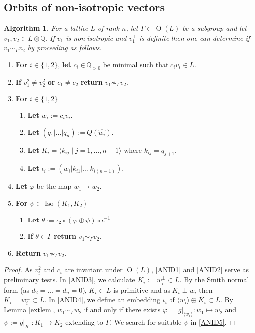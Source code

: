 \documentclass[12pt, a4paper]{article}
\newtheorem{algo}{Algorithm}[section]
\newcommand{\QQ}{\mathbb{Q}}
\newcommand{\la}{\langle}
\newcommand{\ra}{\rangle}
\newcommand{\opn}{\operatorname}
\newcommand{\op}{\oplus}
\begin{document}
\subsection{Orbits of non-isotropic vectors}
\begin{algo}\label{non_iso_def_alg}
  For a lattice $L$ of rank $n$,  let $\Gamma \subset \opn{O}(L)$ be a subgroup and let $v_1, v_2 \in L \otimes \QQ$.
  If $v_1$ is non-isotropic and $v_1^{\perp}$ is definite then one can determine if $v_1  \sim_{\Gamma} v_2$ by proceeding as follows. 
\end{algo}
\begin{enumerate}
\item \textbf{For} $i \in \{1,2 \}$, \textbf{let} $c_i \in \QQ_{>0}$ be minimal such that $c_i v_i \in L$. \label{ANID1}
\item    \textbf{If} $v_1^2 \neq v_2^2$ \textbf{or} $c_1 \neq c_2$ \textbf{return} $v_1 \not \sim_{\Gamma} v_2$.    \label{ANID2}
\item \textbf{For} $i \in \{1,2 \}$         \label{ANID3}
  \begin{enumerate}
  \item \textbf{Let} $w_i := c_i v_i$.
  \item \textbf{Let} $(q_1 \vert \ldots \vert q_n):=Q(\hat{w_i})$.
  \item \textbf{Let} $K_i=\la k_{ij} \mid j=1, \ldots, n-1 \ra$ where $k_{ij}=q_{j+1}$.
  \item \textbf{Let} $\iota_i:=(w_i \vert k_{i1} \vert \ldots \vert k_{i(n-1)})$.
  \end{enumerate}
\item  \textbf{Let} $\varphi$ be the map $w_1 \mapsto w_2$. \label{ANID4}
\item \textbf{For} $\psi \in \opn{Iso}(K_1, K_2)$ \label{ANID5}
  \begin{enumerate}
  \item \textbf{Let} $\theta:=\iota_2 \circ (\varphi \op \psi) \circ \iota_1^{-1}$
  \item \textbf{If} { $\theta \in \Gamma$}
    \textbf{return} $v_1 \sim_{\Gamma} v_2$.
  \end{enumerate}
\item \textbf{Return} $v_1 \not \sim_{\Gamma} v_2$. \label{ANID6}
\end{enumerate}
\begin{proof}
  As $v_i^2$ and $c_i$ are invariant under $\opn{O}(L)$, \ref{ANID1} and \ref{ANID2} serve as preliminary tests.
In \ref{ANID3}, we calculate $K_i:=w_i^{\perp} \subset L$.
  By the Smith normal form (as $d_2 = \ldots = d_n = 0$), $K_i \subset L$ is primitive and as $K_i \perp w_i$ then $K_i = w_i^{\perp} \subset L$.
In \ref{ANID4}, we define an embedding $\iota_i$ of $\la w_i \ra \op K_i \subset L$.
By Lemma \ref{extlem}, $w_1 \sim_{\Gamma} w_2$ if and only if there exists $\varphi:=g \vert_{\la w_1 \ra}: w_1 \mapsto w_2$
and
$\psi:=g \vert_{K_1}: K_1 \rightarrow K_2$ extending to $\Gamma$.
We search for suitable $\psi$ in \ref{ANID5}.
\end{proof}
\end{document}
